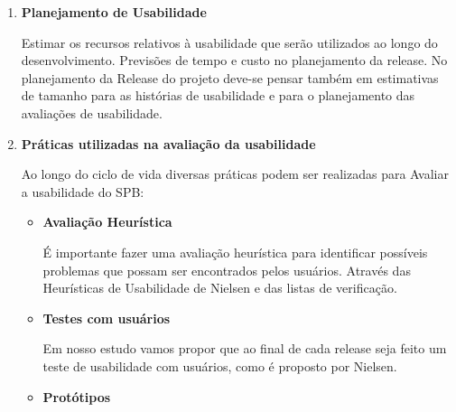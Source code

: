 \begin{enumerate}
	
		
	\item \textbf{Planejamento de Usabilidade}

	Estimar os recursos relativos à usabilidade que serão utilizados ao longo do desenvolvimento. Previsões de tempo e custo no planejamento da release. No planejamento da Release do projeto deve-se pensar também em estimativas de tamanho para as histórias de usabilidade e para o planejamento das avaliações de usabilidade.


	\item \textbf{Práticas utilizadas na avaliação da usabilidade}

	Ao longo do ciclo de vida diversas práticas podem ser realizadas para Avaliar a usabilidade do SPB:
	
		
	\begin{itemize}
		\item \textbf{Avaliação Heurística}
		
		É importante fazer uma avaliação heurística para identificar possíveis problemas que possam ser encontrados pelos usuários. Através das Heurísticas de Usabilidade de Nielsen e das listas de verificação.
		
	
		\item \textbf{Testes com usuários}
		
		Em nosso estudo vamos propor que ao final de cada release seja feito um teste de usabilidade com usuários, como é proposto por Nielsen.

		\item \textbf{Protótipos}


\end{itemize}
\end{enumerate}
